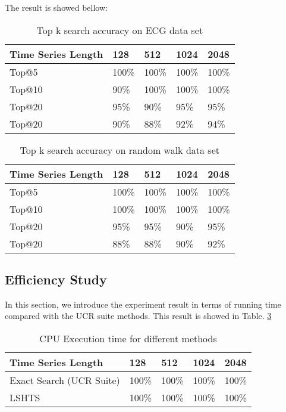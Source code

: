 \documentclass{article}
\begin{document}
The result is showed bellow:

\begin{table}[t]
  \caption{Top k search accuracy on ECG data set}
  \label{accuracy_ecg}
  \centering
  \begin{tabular}{lllll}
    \toprule
    Time Series Length     & 128     & 512  & 1024  & 2048\\
    \midrule
    Top@5 & 100\%  & 100\% & 100\% & 100\%     \\
    Top@10 & 90\%  & 100\% & 100\% & 100\%     \\
    Top@20 & 95\%  & 90\% & 95\% & 95\%     \\
    Top@20 & 90\%  & 88\% & 92\% & 94\%     \\
    \bottomrule
  \end{tabular}
\end{table}

\begin{table}[t]
  \caption{Top k search accuracy on random walk data set}
  \label{accuracy_random}
  \centering
  \begin{tabular}{lllll}
    \toprule
    Time Series Length     & 128     & 512  & 1024  & 2048\\
    \midrule
    Top@5 & 100\%  & 100\% & 100\% & 100\%     \\
    Top@10 & 100\%  & 100\% & 100\% & 100\%     \\
    Top@20 & 95\%  & 95\% & 90\% & 95\%     \\
    Top@20 & 88\%  & 88\% & 90\% & 92\%     \\
    \bottomrule
  \end{tabular}
\end{table}

\subsection{Efficiency Study}

In this section, we introduce the experiment result in terms of running time compared with the UCR suite methods. This result is showed in Table. \ref{time}

\begin{table}[t]
  \caption{CPU Execution time for different methods}
  \label{time}
  \centering
  \begin{tabular}{lllll}
    \toprule
    Time Series Length     & 128     & 512  & 1024  & 2048\\
    \midrule
    Exact Search (UCR Suite) & 100\%  & 100\% & 100\% & 100\%     \\
    LSHTS & 100\%  & 100\% & 100\% & 100\%     \\
    \bottomrule
  \end{tabular}
\end{table}
\end{document}
